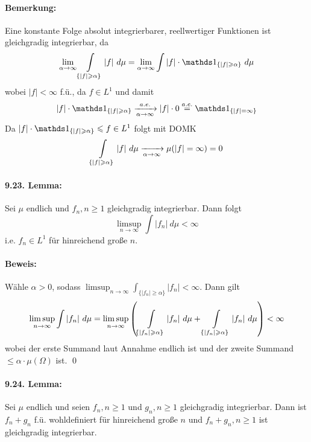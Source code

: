 \paragraph{Bemerkung:}Eine konstante Folge absolut integrierbarer, reellwertiger Funktionen ist gleichgradig integrierbar, da
$$\lim_{\alpha\to\infty}\int\displaylimits_{\{|f|\geq\alpha\}}|f|\ d\mu=\lim_{\alpha\to\infty}\int|f|\cdot\ind{\{|f|\geq\alpha\}}\ d\mu$$
wobei $|f|<\infty$ f.\"u., da $f\in L^1$ und damit 
$$|f|\cdot\ind{\{|f|\geq\alpha\}}\nto{a.e.}{\alpha\to\infty}|f|\cdot0\overset{a.e.}{=}\ind{\{|f|=\infty\}}$$
Da $|f|\cdot\ind{\{|f|\geq\alpha\}}\leq f\in L^1$ folgt mit DOMK
$$\int\displaylimits_{\{|f|\geq\alpha\}}|f|\ d\mu\nto{}{\alpha\to\infty}\mu(|f|=\infty)=0$$

\paragraph{9.23. Lemma:}Sei $\mu$ endlich und $f_n,n\geq1$ gleichgradig integrierbar. Dann folgt
$$\limsup_{n\to\infty}\int|f_n|\ d\mu<\infty$$
i.e. $f_n\in L^1$ f\"ur hinreichend gro\ss{}e $n$.

\paragraph{Beweis:}W\"ahle $\alpha>0$, sodass $\limsup_{n\to\infty}\int_{\{|f_n|\geq\alpha\}}|f_n|<\infty$. Dann gilt
$$\limsup_{n\to\infty}\int|f_n|\ d\mu=\limsup_{n\to\infty}\left(\int\displaylimits_{\{|f_n|\geq\alpha\}}|f_n|\ d\mu+\int\displaylimits_{\{|f_n|\geq\alpha\}}|f_n|\ d\mu\right)<\infty$$
wobei der erste Summand laut Annahme endlich ist und der zweite Summand $\leq\alpha\cdot\mu(\Omega)$ ist. \qed

\paragraph{9.24. Lemma:}Sei $\mu$ endlich und seien $f_n,n\geq1$ und $g_n,n\geq1$ gleichgradig integrierbar. Dann ist $f_n+g_n$ f.\"u. wohldefiniert f\"ur hinreichend gro\ss{}e $n$ und $f_n+g_n,n\geq1$ ist gleichgradig integrierbar.

